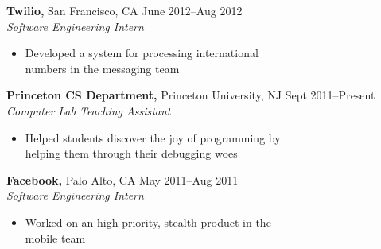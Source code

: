 \documentclass[margin]{res}
\begin{document}
\begin{resume}
 {\bf Twilio,} San Francisco, CA \hfill June 2012--Aug 2012 \\
 {\it Software Engineering Intern}
 \begin{itemize} \itemsep -2pt  %
 \item Developed a system for processing international \\
   numbers in the messaging team
 \end{itemize}

 {\bf Princeton CS Department,} Princeton University, NJ \hfill Sept 2011--Present \\
 {\it Computer Lab Teaching Assistant}
 \begin{itemize} \itemsep -2pt  %
 \item Helped students discover the joy of programming by \\
   helping them through their debugging woes
 \end{itemize}

 {\bf Facebook,} Palo Alto, CA \hfill May 2011--Aug 2011 \\
 {\it Software Engineering Intern}
 \begin{itemize} \itemsep -2pt  %
 \item Worked on an high-priority, stealth product in the \\
   mobile team
 \end{itemize}




\end{resume}
\end{document}

